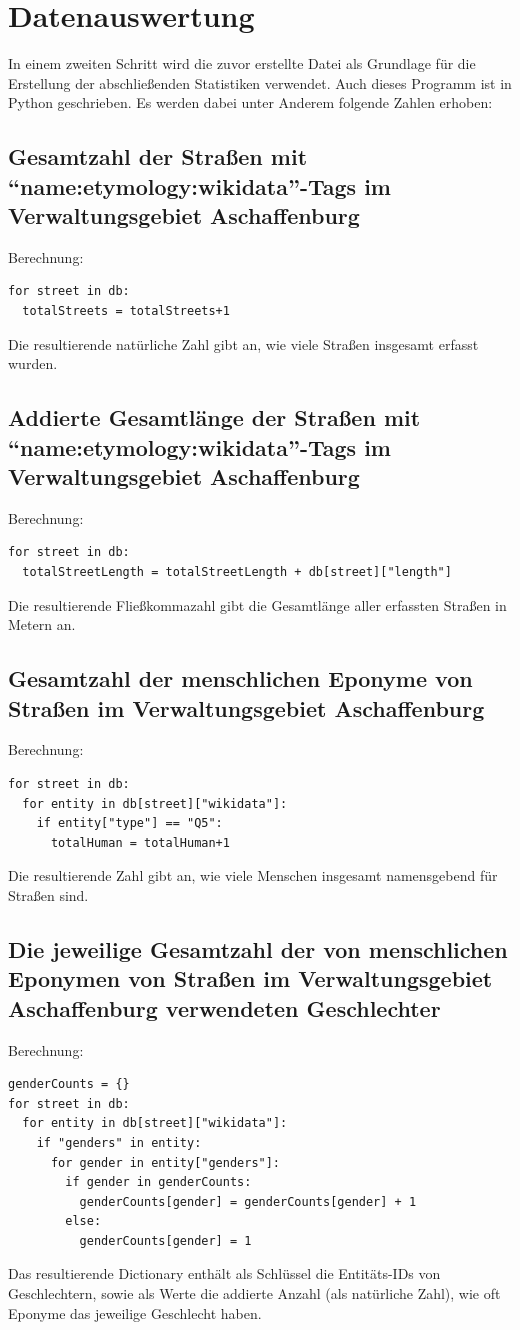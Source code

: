 \documentclass[ngerman,twocolumn,showpacs,%
  nofootinbib,aps,superscriptaddress,%
  eqsecnum,prd,notitlepage,showkeys,10pt,report]{revtex4-2}
\begin{document}
\section{Datenauswertung}
In einem zweiten Schritt wird die zuvor erstellte Datei als Grundlage für die Erstellung
der abschließenden Statistiken verwendet. Auch dieses Programm ist in Python
geschrieben.
Es werden dabei unter Anderem folgende Zahlen erhoben:

\subsection{Gesamtzahl der Straßen mit “name:etymology:wikidata”-Tags im
Verwaltungsgebiet Aschaffenburg}
Berechnung:
\begin{lstlisting}
for street in db:
  totalStreets = totalStreets+1
\end{lstlisting}
Die resultierende natürliche Zahl gibt an, wie viele Straßen insgesamt erfasst wurden.

\subsection{Addierte Gesamtlänge der Straßen mit “name:etymology:wikidata”-Tags
im Verwaltungsgebiet Aschaffenburg}
Berechnung:
\begin{lstlisting}
for street in db:
  totalStreetLength = totalStreetLength + db[street]["length"]
\end{lstlisting}
Die resultierende Fließkommazahl gibt die Gesamtlänge aller erfassten Straßen in Metern
an.

\subsection{Gesamtzahl der menschlichen Eponyme von Straßen im
Verwaltungsgebiet Aschaffenburg}
Berechnung:
\begin{lstlisting}
for street in db:
  for entity in db[street]["wikidata"]:
    if entity["type"] == "Q5":
      totalHuman = totalHuman+1
\end{lstlisting}
Die resultierende Zahl gibt an, wie viele Menschen insgesamt namensgebend für Straßen
sind.

\subsection{Die jeweilige Gesamtzahl der von menschlichen Eponymen von Straßen
im Verwaltungsgebiet Aschaffenburg verwendeten Geschlechter}
Berechnung:
\begin{lstlisting}
genderCounts = {}
for street in db:
  for entity in db[street]["wikidata"]:
    if "genders" in entity:
      for gender in entity["genders"]:
        if gender in genderCounts:
          genderCounts[gender] = genderCounts[gender] + 1
        else:
          genderCounts[gender] = 1
\end{lstlisting}
Das resultierende Dictionary enthält als Schlüssel die Entitäts-IDs von Geschlechtern, sowie
als Werte die addierte Anzahl (als natürliche Zahl), wie oft Eponyme das jeweilige
Geschlecht haben.
\end{document}
